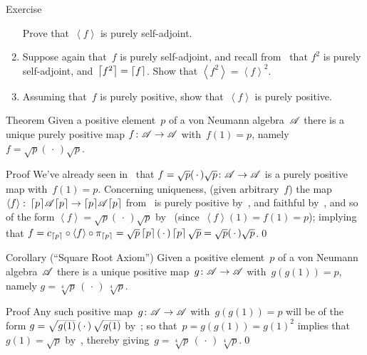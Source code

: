 \documentclass[a]{subfiles}
\begin{document}
\begin{parsec}
\begin{point}{Exercise}
\begin{enumerate}
Prove that~$\left<f\right>$
is purely self-adjoint.
\item
Suppose again that~$f$ is purely self-adjoint,
and recall from~ that $f^2$
is purely self-adjoint, and~$\left\lceil f^2\right\rceil = \left\lceil f\right\rceil$.
Show that $\left<f^2\right> = \left<f\right>^2$.
\item
Assuming that~$f$ is purely positive,
show that~$\left<f\right>$ is purely positive.
\end{enumerate}
\end{point}
\begin{point}{Theorem}%
Given a positive element~$p$ of a von Neumann algebra~$\mathscr{A}$
there is a unique purely positive map $f\colon \mathscr{A}\to\mathscr{A}$
with~$f(1)=p$,
namely~$f=\sqrt{p}(\,\cdot\,)\sqrt{p}$.
\begin{point}{Proof}%
We've already seen in~
that $f=\sqrt{p}(\,\cdot\,)\sqrt{p}\colon \mathscr{A}\to\mathscr{A}$
is a purely positive map with~$f(1)=p$.
Concerning uniqueness,
(given arbitrary~$f$)
the map~$\left<f\right>\colon \left\lceil p\right\rceil\!\mathscr{A}\!\left\lceil p\right\rceil
\to \left\lceil p\right\rceil\!\mathscr{A}\!\left\lceil p\right\rceil$
from~
is purely positive by~,
and faithful by~,
and so of the form
$\left<f\right>=\sqrt{p}(\,\cdot\,)\sqrt{p}$
by~
(since~$\left<f\right>\!(1)=f(1)=p$);
implying that
$f= c_{\left\lceil p\right\rceil}\circ\left<f\right>\circ \pi_{\left\lceil p\right\rceil}
= \sqrt{p}\left\lceil p\right\rceil(\,\cdot\,)\left\lceil p\right\rceil\sqrt{p}
= \sqrt{p}(\,\cdot\,)\sqrt{p}$.\qed
\end{point}
\end{point}
\begin{point}{Corollary (``Square Root Axiom'')}%
Given a positive element~$p$ of a von Neumann algebra~$\mathscr{A}$
there is a unique positive map~$g\colon \mathscr{A}\to\mathscr{A}$
with~$g(g(1))=p$, namely
$g=\sqrt[4]{p}\,(\,\cdot\,)\,\sqrt[4]{p}$.
\begin{point}{Proof}%
Any such positive map~$g\colon \mathscr{A}\to\mathscr{A}$ with~$g(g(1))=p$
will be of the form
$g=\smash{\sqrt{g(1)}\,(\,\cdot\,)\,\sqrt{g(1)}}$
by~;
so that~$p=g(g(1))=g(1)^2$
implies that~$g(1)=\sqrt{p}$
by~,
thereby giving~$g=\sqrt[4]{p}\,(\,\cdot\,)\,\sqrt[4]{p}$.\qed
\end{point}
\end{point}
\end{parsec}
\end{document}
